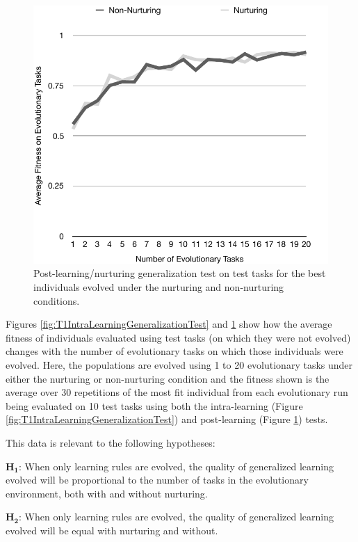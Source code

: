 \documentclass[master]{outhesis}
\begin{document}
\begin{figure}[h]
	\centering
	\includegraphics{T1PostLearningGeneralizationTest.pdf}
	\caption{Post-learning/nurturing generalization test on test tasks for the best individuals evolved under the nurturing and non-nurturing conditions.}
	\label{fig:T1PostLearningGeneralizationTest}
\end{figure}

Figures \ref{fig:T1IntraLearningGeneralizationTest} and \ref{fig:T1PostLearningGeneralizationTest} show how the average fitness of individuals evaluated using test tasks (on which they were not evolved) changes with the number of evolutionary tasks on which those individuals were evolved.
Here,
the populations are evolved using 1 to 20 evolutionary tasks under either the nurturing or non-nurturing condition
and the fitness shown is the average over 30 repetitions of the most fit individual from each evolutionary run being evaluated on 10 test tasks
using both the intra-learning (Figure \ref{fig:T1IntraLearningGeneralizationTest}) 
and post-learning (Figure \ref{fig:T1PostLearningGeneralizationTest}) tests.

This data is relevant to the following hypotheses:

$\mathbf{H_1}$: When only learning rules are evolved, the quality of generalized learning evolved will be proportional to the number of tasks in the evolutionary environment, both with and without nurturing.

$\mathbf{H_2}$: When only learning rules are evolved, the quality of generalized learning evolved will be equal with nurturing and without.
\end{document}
